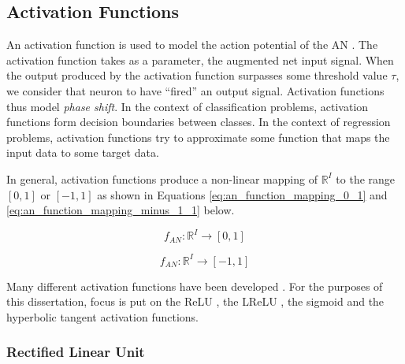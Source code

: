 \subsection{Activation Functions}\label{sec:anns:an:act_functions}

An activation function is used to model the action potential of the \ac{AN} \cite{ref:ziv:1994, ref:hodgkin:1952}. The activation function takes as a parameter, the augmented net input signal. When the output produced by the activation function surpasses some threshold value $\tau$, we consider that neuron to have ``fired'' an output signal. Activation functions thus model \textit{phase shift}. In the context of classification problems, activation functions form decision boundaries between classes. In the context of regression problems, activation functions try to approximate some function that maps the input data to some target data.

In general, activation functions produce a non-linear mapping of $\mathbb{R}^{I}$ to the range $[0,1]$ or $[-1,1]$ as shown in Equations \eqref{eq:an_function_mapping_0_1} and \eqref{eq:an_function_mapping_minus_1_1} below.

\begin{equation}
    f_{AN}: \mathbb{R}^{I} \rightarrow [0,1]
    \label{eq:an_function_mapping_0_1}
\end{equation}

\begin{equation}
    f_{AN}: \mathbb{R}^{I} \rightarrow [-1,1]
    \label{eq:an_function_mapping_minus_1_1}
\end{equation}

\noindent
Many different activation functions have been developed \cite{ref:karlik:2011}. For the purposes of this dissertation, focus is put on the \acf{ReLU} \cite{ref:jarrett:2009, ref:nair:2010}, the \acf{LReLU} \cite{ref:maas:2013}, the sigmoid \cite{ref:lecun:1988} and the hyperbolic tangent \cite{ref:lin:2008} activation functions.


\subsubsection{Rectified Linear Unit}\label{sec:anns:an:act_functions:relu}

